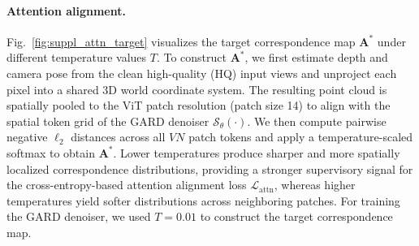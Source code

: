 \documentclass{llmxive}
\begin{document}
\paragraph{Attention alignment.}
Fig.~\ref{fig:suppl_attn_target} visualizes the target correspondence map $\mathbf{A}^*$ under different temperature values $T$. To construct $\mathbf{A}^*$, we first estimate depth and camera pose from the clean high-quality (HQ) input views and unproject each pixel into a shared 3D world coordinate system. The resulting point cloud is spatially pooled to the ViT patch resolution (patch size 14) to align with the spatial token grid of the GARD denoiser $\mathcal{S}_{\theta}(\cdot)$. We then compute pairwise negative $\ell_2$ distances across all $VN$ patch tokens and apply a temperature-scaled softmax to obtain $\mathbf{A}^*$. Lower temperatures produce sharper and more spatially localized correspondence distributions, providing a stronger supervisory signal for the cross-entropy-based attention alignment loss $\mathcal{L}_{\text{attn}}$, whereas higher temperatures yield softer distributions across neighboring patches. For training the GARD denoiser, we used $T=0.01$ to construct the target correspondence map.
\end{document}
